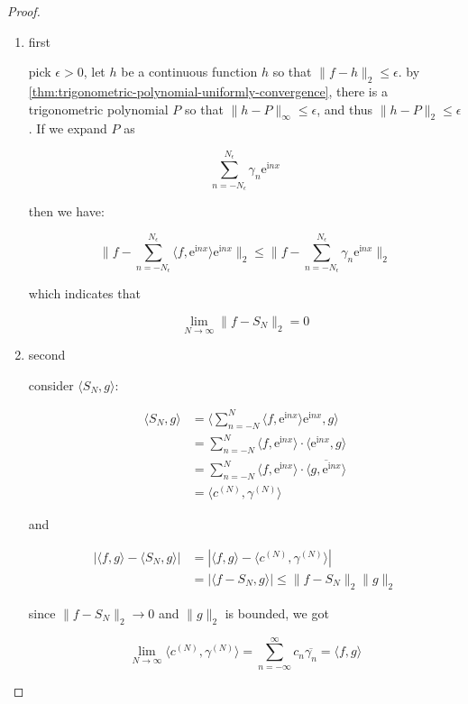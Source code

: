 \begin{proof}
\begin{enumerate}
    \item first

pick $\epsilon > 0$, let $h$ be a continuous function $h$ so that $\| f - h\|_2 \le \epsilon$.
by \autoref{thm:trigonometric-polynomial-uniformly-convergence}, there is a trigonometric polynomial $P$
so that $\| h - P \|_{\infty} \le \epsilon$, and thus $\| h - P \|_2 \le \epsilon$. If we expand $P$ as

\[
    \sum_{n=-N_{\epsilon}}^{N_\epsilon} \gamma_n \mathrm{e}^{\mathrm{i}nx}
\]

then we have:

\[
\|f -\sum_{n=-N_{\epsilon}}^{N_\epsilon} \langle f, \mathrm{e}^{\mathrm{i}nx}\rangle \mathrm{e}^{\mathrm{i}nx}\|_2 \le \|f -\sum_{n=-N_{\epsilon}}^{N_\epsilon} \gamma_n \mathrm{e}^{\mathrm{i}nx}\|_2
\]

which indicates that

\[
    \lim_{N \to \infty} \| f - S_N \|_2 = 0
\]

    \item second

    consider $\langle S_N ,g \rangle$:

    \begin{align*}
        \langle S_N, g \rangle &= \langle \sum_{n=-N}^{N}\langle f, \mathrm{e}^{\mathrm{i}nx} \rangle\mathrm{e}^{\mathrm{i}nx}, g \rangle \\
&=\sum_{n=-N}^{N} \langle f, \mathrm{e}^{\mathrm{i}nx} \rangle \cdot \langle \mathrm{e}^{\mathrm{i}nx}, g \rangle \\ 
&=\sum_{n=-N}^{N} \langle f, \mathrm{e}^{\mathrm{i}nx} \rangle \cdot \overline{\langle g, \mathrm{e}^{\mathrm{i}nx}\rangle} \\ 
&= \langle c^{(N)}, \gamma^{(N)}\rangle
    \end{align*}

    and

    \begin{align*}
        \left|\langle f, g \rangle - \langle S_N, g \rangle \right| &= \left|\langle f, g \rangle - \langle c^{(N)}, \gamma^{(N)}\rangle \right| \\
        &= \left|\langle f- S_N, g \rangle \right| \le \| f - S_N\|_2 \| g \|_2
    \end{align*}

    since $\| f- S_N \|_2 \to 0$ and $\| g \|_2$ is bounded, we got

    \[
        \lim_{N \to \infty} \langle c^{(N)}, \gamma^{(N)}\rangle = \sum_{n=-\infty}^{\infty} c_n \overline{\gamma_n} = \langle f ,g  \rangle
    \]


\end{enumerate}
\end{proof}
